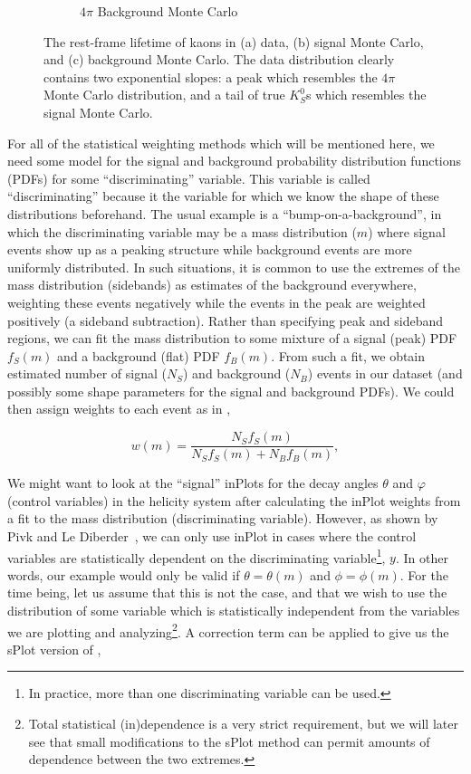\begin{figure}
\begin{center}
\begin{subfigure}{.45\columnwidth}
      \caption{$4\pi$ Background Monte Carlo}
      \label{fig:rfl-bkgmc}
    \end{subfigure}
  \end{center}
  \caption{The rest-frame lifetime of kaons in (a) data, (b) signal Monte Carlo, and (c) background Monte Carlo. The data distribution clearly contains two exponential slopes: a peak which resembles the $4\pi$ Monte Carlo distribution, and a tail of true $K_S^0$s which resembles the signal Monte Carlo.}\label{fig:rfl-pre-splot}
\end{figure}

For all of the statistical weighting methods which will be mentioned here, we need some model for the signal and background probability distribution functions (PDFs) for some ``discriminating'' variable. This variable is called ``discriminating'' because it the variable for which we know the shape of these distributions beforehand. The usual example is a ``bump-on-a-background'', in which the discriminating variable may be a mass distribution ($m$) where signal events show up as a peaking structure while background events are more uniformly distributed. In such situations, it is common to use the extremes of the mass distribution (sidebands) as estimates of the background everywhere, weighting these events negatively while the events in the peak are weighted positively (a sideband subtraction). Rather than specifying peak and sideband regions, we can fit the mass distribution to some mixture of a signal (peak) PDF $f_S(m)$ and a background (flat) PDF $f_B(m)$. From such a fit, we obtain estimated number of signal ($N_S$) and background ($N_B$) events in our dataset (and possibly some shape parameters for the signal and background PDFs). We could then assign weights to each event as in ,

\begin{equation}
  w(m) = \frac{N_S f_S(m)}{N_S f_S(m) + N_B f_B(m)},
  \label{eq:inplot-weights-mass}
\end{equation}

We might want to look at the ``signal'' inPlots for the decay angles $\theta$ and $\varphi$ (control variables) in the helicity system after calculating the inPlot weights from a fit to the mass distribution (discriminating variable). However, as shown by Pivk and Le Diberder~\cite{Pivk2005}, we can only use inPlot in cases where the control variables are statistically dependent on the discriminating variable\footnote{In practice, more than one discriminating variable can be used.}, $y$. In other words, our example would only be valid if $\theta = \theta(m)$ and $\phi = \phi(m)$. For the time being, let us assume that this is not the case, and that we wish to use the distribution of some variable which is statistically independent from the variables we are plotting and analyzing\footnote{Total statistical (in)dependence is a very strict requirement, but we will later see that small modifications to the sPlot method can permit amounts of dependence between the two extremes.}. A correction term can be applied to give us the sPlot version of ,

